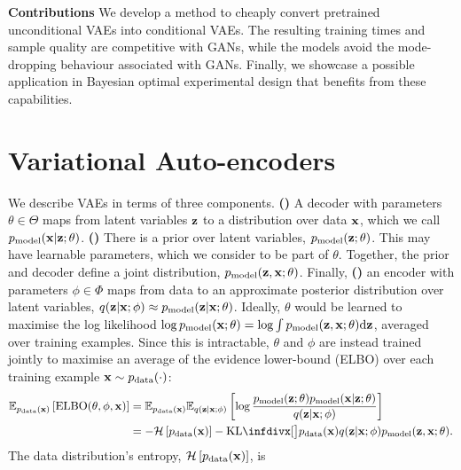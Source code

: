 
\textbf{Contributions} We develop a method to cheaply convert pretrained
unconditional VAEs into conditional VAEs. The resulting training times and
sample quality are competitive with GANs, while the models avoid the
mode-dropping behaviour associated with GANs. Finally, we showcase a possible
application in Bayesian optimal experimental design that benefits from these
capabilities.

\section{Variational Auto-encoders}
We describe VAEs in terms of three components. \textbf{()} A decoder with
parameters $\theta\in\Theta$ maps from latent variables $\mathbf{z}{}$ to a distribution
over data $\mathbf{x}{}$, which we call $p_{\rm{model}}{}(\mathbf{x} | \mathbf{z}{}; \theta)$. \textbf{()}
There is a prior over latent variables, $p_{\rm{model}}{}(\mathbf{z}{};\theta)$. This may have
learnable parameters, which we consider to be part of $\theta$. Together, the
prior and decoder define a joint distribution, $p_{\rm{model}}{}(\mathbf{z}{}, \mathbf{x}{}; \theta)$.
Finally, \textbf{()} an encoder with parameters $\phi\in\Phi$ maps from
data to an approximate posterior distribution over latent variables, $q(\mathbf{z}{}|\mathbf{x}{};
\phi) \approx p_{\rm{model}}{}(\mathbf{z}{}|\mathbf{x}{}; \theta)$. Ideally, $\theta$ would be learned to
maximise the log likelihood $\log p_{\rm{model}}{}(\mathbf{x}{}; \theta) = \log \int
p_{\rm{model}}{}(\mathbf{z}{}, \mathbf{x}{}; \theta) \mathrm{d}\mathbf{z}{}$, averaged over training examples. Since
this is intractable, $\theta$ and $\phi$ are instead trained jointly to maximise
an average of the evidence lower-bound (ELBO) over each training example $\mathbf{x}{}
\sim p_{\rm{data}}{}(\cdot)$:
\begin{align}
  \EX_{\pdata{}(\I{})} \left[ \text{ELBO}(\theta, \phi, \I{}) \right] &= \EX_{\pdata(\I{})} \EX_{q(\z{}|\I{}; \phi)} \left[ \log\frac{\pmodel{}(\z{}; \theta)\pmodel{}(\I{}|\z{}; \theta)}{q(\z{}|\I{}; \phi)} \right] \label{eq:eelbo}\\
                                                                      &= -\mathcal{H}\left[ \pdata(\I) \right] - \kl[\big] { \pdata{}(\I{})q(\z{}|\I{}; \phi) }{ \pmodel{}(\z{}, \I; \theta) }. \label{eq:elbo-kl-joints}
\end{align}
The data distribution's entropy, $\mathcal{H}\left[ p_{\rm{data}}(\mathbf{x}) \right]$, is
